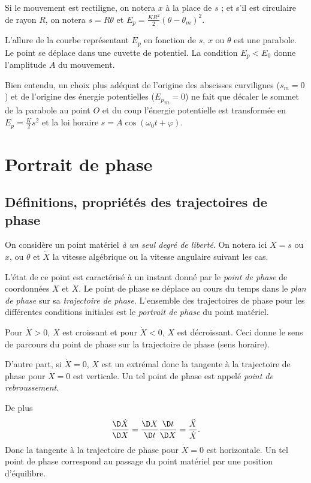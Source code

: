 Si le mouvement est rectiligne, on notera $x$ à la place de $s$ ; et s'il est circulaire de rayon $R$, on notera $s=R\theta$ et $E_p = \frac{KR^2}{2}(\theta-\theta_m)^2$.

L'allure de la courbe représentant $E_p$ en fonction de $s$, $x$ ou $\theta$ est une parabole. Le point se déplace dans une cuvette de potentiel. La condition $E_p < E_0$ donne l'amplitude $A$ du mouvement.

Bien entendu, un choix plus adéquat de l'origine des abscisses curvilignes ($s_m=0$) et de l'origine des énergie potentielles (${E_p}_m=0$) ne fait que décaler le sommet de la parabole au point $O$ et du coup l'énergie potentielle est transformée en $E_p = \frac{K}{2}s^2$ et la loi horaire $s=A\cos(\omega_0 t +\varphi)$.

\section{Portrait de phase}
\label{chap5-sec:portratitdephase}

\subsection{Définitions, propriétés des trajectoires de phase}
\label{chap5-subsec:trajectoiresdephase}

On considère un point matériel \emph{à un seul degré de liberté}. On notera ici $X=s$ ou $x$, ou $\theta$ et $\dot{X}$ la vitesse algébrique ou la vitesse angulaire suivant les cas.

L'état de ce point est caractérisé à un instant donné par le \emph{point de phase} de coordonnées $X$ et $\dot{X}$. Le point de phase se déplace au cours du temps dans le \emph{plan de phase} sur sa \emph{trajectoire de phase}. L'ensemble des trajectoires de phase pour les différentes conditions initiales est le \emph{portrait de phase} du point matériel.

Pour $\dot{X}>0$, $X$ est croissant et pour $\dot{X}<0$, $X$ est décroissant. Ceci donne le sens de parcours du point de phase sur la trajectoire de phase (sens horaire).

D'autre part, si $\dot{X}=0$, $X$ est un extrémal donc la tangente à la trajectoire de phase pour $\dot{X}=0$ est verticale. Un tel point de phase est appelé \emph{point de rebroussement}. 

De plus
\begin{equation}
  \derived{\dot{X}}{X} = \derived{X}{t} \derived{t}{X} = \frac{\ddot{X}}{\dot{X}}.
\end{equation}
Donc la tangente à la trajectoire de phase pour $\dot{X}=0$ est horizontale. Un tel point de phase correspond au passage du point matériel par une position d'équilibre.

